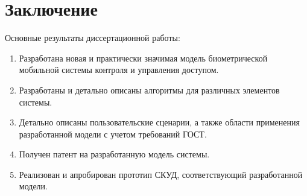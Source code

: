 \chapter*{Заключение}						%

Основные результаты диссертационной работы:
\begin{enumerate}
  \item Разработана новая и практически значимая модель биометрической мобильной системы контроля и управления доступом.
  \item Разработаны и детально описаны алгоритмы для различных элементов системы.
  \item Детально описаны пользовательские сценарии, а также области применения разработанной модели с учетом требований ГОСТ.
  \item Получен патент на разработанную модель системы.
  \item Реализован и апробирован прототип СКУД, соответствующий разработанной модели.
\end{enumerate}

\clearpage
